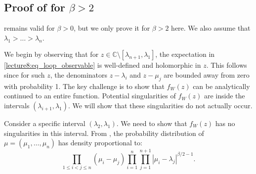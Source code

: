 \documentclass[letterpaper,11pt,oneside,reqno]{book}
\numberwithin{equation}{chapter}  %
\theoremstyle{definition}
\begin{document}
\subsection{Proof \texorpdfstring{of }{} for $\beta>2$}

 remains
valid for $\beta>0$, but we only prove it for $\beta>2$ here.
We also assume that $\lambda_1>\ldots>\lambda_n $.


We begin by observing that for $z \in \mathbb{C} \setminus [\lambda_{n+1}, \lambda_1]$, the expectation in \eqref{lecture8:eq_loop_observable} is well-defined and holomorphic in $z$. This follows since for such $z$, the denominators $z-\lambda_i$ and $z-\mu_j$ are bounded away from zero with probability 1.
The key challenge is to show that $f_W(z)$ can be analytically continued to an entire function.
Potential singularities of $f_W(z)$ are inside the intervals $(\lambda_{i+1}, \lambda_{1})$. We will show that these singularities do not actually occur.

Consider a specific interval $(\lambda_2, \lambda_{1})$. We need to show that $f_W(z)$ has no singularities in this interval.
From , the probability distribution of $\mu = (\mu_1, \ldots, \mu_n)$ has density proportional to:
\begin{equation*}
	\prod_{1\le i<j\le n} (\mu_i - \mu_j) \prod_{i=1}^{n} \prod_{j=1}^{n+1} |\mu_i - \lambda_j|^{\beta/2-1}.
\end{equation*}
\end{document}
